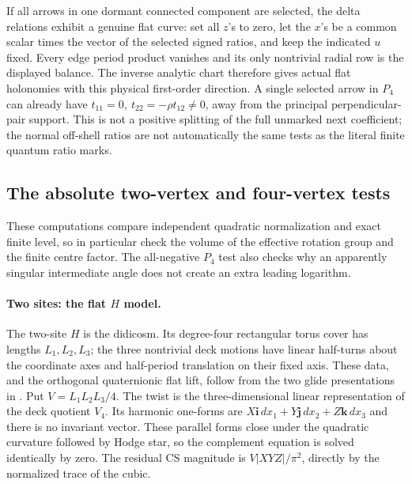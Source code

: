 If all arrows in one dormant connected component are
selected, the delta relations exhibit a genuine flat
curve: set all \(z\)'s to zero, let the \(x\)'s be a
common scalar times the vector of the selected signed
ratios, and keep the indicated \(u\) fixed. Every edge
period product vanishes and its only nontrivial radial
row is the displayed balance. The inverse analytic
chart therefore gives actual flat holonomies with this
physical first-order direction. A single selected arrow
in \(P_4\) can already have
\(t_{11}=0,\ t_{22}=-\rho t_{12}\ne0\), away from the
principal perpendicular-pair support. This is not a
positive splitting of the full unmarked next
coefficient; the normal off-shell ratios are not
automatically the same tests as the literal finite
quantum ratio marks.

\subsection{The absolute two-vertex and four-vertex tests}
\label{classic:sec:benchmarks}
These computations compare independent quadratic normalization and
exact finite level, so in particular check the volume of the effective
rotation group and the finite centre factor. The all-negative
\(P_4\) test also checks why an apparently singular intermediate
angle does not create an extra leading logarithm.

\paragraph{Two sites: the flat \(H\) model.}
The two-site \(H\) is the didicosm. Its degree-four rectangular torus
cover has lengths \(L_1,L_2,L_3\); the three nontrivial deck motions
have linear half-turns about the coordinate axes and half-period
translation on their fixed axis. These data, and the orthogonal
quaternionic flat lift, follow from the two glide presentations
in \cite[\S2]{P49}. Put \(V=L_1L_2L_3/4\).
The twist is the three-dimensional linear representation of the
deck quotient \(V_4\). Its harmonic one-forms are
\(X\mathbf i\,dx_1+Y\mathbf j\,dx_2+Z\mathbf k\,dx_3\) and
there is no invariant vector. These parallel forms close under the
quadratic curvature followed by Hodge star, so the complement
equation is solved identically by zero. The residual CS magnitude
is \(V|XYZ|/\pi^2\), directly by the normalized trace of the cubic.

